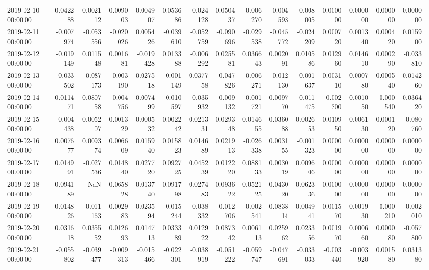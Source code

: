 \begin{tabular}{lrrrrrrrrrrrrrr}
2019-02-10 00:00:00 & 0.042288 & 0.002112 & 0.009003 & 0.004907 & 0.053686 & -0.024128 & 0.050437 & -0.006270 & -0.004593 & -0.008005 & 0.000000 & 0.000000 & 0.000000 & 0.000000 \\
2019-02-11 00:00:00 & -0.007974 & -0.053556 & -0.020026 & 0.005426 & -0.039610 & -0.052759 & -0.090696 & -0.029538 & -0.045772 & -0.024209 & 0.000720 & 0.001340 & 0.000420 & 0.015900 \\
2019-02-12 00:00:00 & -0.019149 & 0.011548 & 0.001681 & -0.019428 & 0.013388 & -0.006292 & 0.025581 & 0.036643 & 0.002091 & 0.010586 & 0.012960 & 0.014610 & 0.000290 & -0.033810 \\
2019-02-13 00:00:00 & -0.033502 & -0.087173 & -0.003190 & 0.027518 & -0.001149 & 0.037758 & -0.047826 & -0.006271 & -0.012130 & -0.001637 & 0.003110 & 0.000780 & 0.000540 & 0.014260 \\
2019-02-14 00:00:00 & 0.011471 & 0.080758 & -0.004756 & 0.007499 & -0.010597 & -0.035932 & -0.009132 & -0.001721 & 0.009770 & -0.011475 & -0.002300 & 0.001050 & -0.000540 & 0.036420 \\
2019-02-15 00:00:00 & -0.004438 & 0.005207 & 0.001329 & 0.000532 & 0.002242 & 0.021331 & 0.029348 & 0.014655 & 0.036088 & 0.002653 & 0.010950 & 0.006130 & 0.000120 & -0.080760 \\
2019-02-16 00:00:00 & 0.007677 & 0.009374 & 0.006609 & 0.015940 & 0.015823 & 0.014689 & 0.021913 & -0.026338 & 0.003155 & -0.001323 & 0.000000 & 0.000000 & 0.000000 & 0.000000 \\
2019-02-17 00:00:00 & 0.014991 & -0.027536 & 0.014840 & 0.027720 & 0.092725 & 0.045239 & 0.012220 & 0.088133 & 0.003019 & 0.009606 & 0.000000 & 0.000000 & 0.000000 & 0.000000 \\
2019-02-18 00:00:00 & 0.094189 & NaN & 0.065828 & 0.013740 & 0.091798 & 0.027483 & 0.093622 & 0.052125 & 0.043020 & 0.062336 & 0.000000 & 0.000000 & 0.000000 & 0.000000 \\
2019-02-19 00:00:00 & 0.014826 & -0.011163 & 0.002983 & 0.023594 & -0.015244 & -0.038332 & -0.012706 & -0.002541 & 0.083814 & 0.004941 & 0.001570 & 0.001930 & -0.000210 & -0.002010 \\
2019-02-20 00:00:00 & 0.031618 & 0.035552 & 0.012693 & 0.014713 & 0.033389 & 0.012922 & 0.087342 & 0.006113 & 0.025962 & 0.023356 & 0.001970 & 0.000660 & 0.000080 & -0.057800 \\
2019-02-21 00:00:00 & -0.055802 & -0.039477 & -0.009313 & -0.015466 & -0.022301 & -0.038919 & -0.051222 & -0.059747 & -0.047691 & -0.033033 & -0.003440 & -0.003920 & 0.001580 & 0.031380 \\

\end{tabular}
